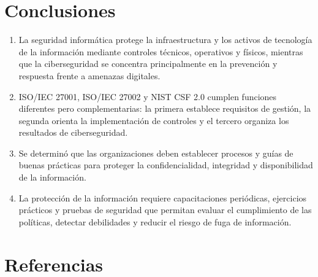 \documentclass[12pt]{article}
\begin{document}
	\section*{Conclusiones}
	
	\begin{enumerate}
		
		\item La seguridad informática protege la infraestructura y los activos de tecnología de la información mediante controles técnicos, operativos y físicos, mientras que la ciberseguridad se concentra principalmente en la prevención y respuesta frente a amenazas digitales.
		
		\item ISO/IEC 27001, ISO/IEC 27002 y NIST CSF 2.0 cumplen funciones diferentes pero complementarias: la primera establece requisitos de gestión, la segunda orienta la implementación de controles y el tercero organiza los resultados de ciberseguridad.
		
		\item Se determinó que las organizaciones deben establecer procesos y guías de buenas prácticas para proteger la confidencialidad, integridad y disponibilidad de la información.
		
		\item La protección de la información requiere capacitaciones periódicas, ejercicios prácticos y pruebas de seguridad que permitan evaluar el cumplimiento de las políticas, detectar debilidades y reducir el riesgo de fuga de información.
		
	\end{enumerate}
	
	\section*{Referencias}
	
\end{document}
